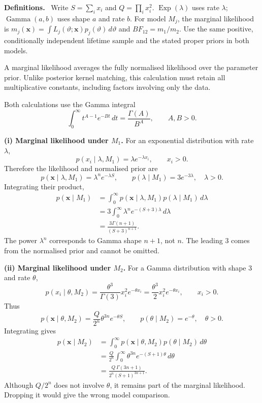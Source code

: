\documentclass[11pt,a4paper]{article}
\newcommand{\xvec}{\boldsymbol{x}}
\newcommand{\studyheading}[1]{%
  \par\medskip\noindent\textcolor{statblue}{\textbf{#1.}}\ }
\begin{document}
\studyheading{Definitions}
Write $S=\sum_i x_i$ and $Q=\prod_i x_i^2$.
$\operatorname{Exp}(\lambda)$ uses rate $\lambda$; $\operatorname{Gamma}(a,b)$ uses shape $a$ and rate $b$.
For model $M_j$, the marginal likelihood is
$m_j(\xvec)=\int L_j(\vartheta;\xvec)p_j(\vartheta)\,d\vartheta$ and $BF_{12}=m_1/m_2$.
Use the same positive, conditionally independent lifetime sample and the stated proper priors in both models.

A marginal likelihood averages the fully normalised likelihood over the
parameter prior. Unlike posterior kernel matching, this calculation must
retain all multiplicative constants, including factors involving only
the data.

Both calculations use the Gamma integral
\[
\int_0^\infty t^{A-1}e^{-Bt}\,dt
=\frac{\Gamma(A)}{B^A},\qquad A,B>0.
\]

\textbf{(i) Marginal likelihood under $M_1$.}
For an exponential distribution with rate $\lambda$,
\[
p(x_i\mid\lambda,M_1)=\lambda e^{-\lambda x_i},\qquad x_i>0.
\]
Therefore the likelihood and normalised prior are
\[
p(\xvec\mid\lambda,M_1)=\lambda^n e^{-\lambda S},
\qquad p(\lambda\mid M_1)=3e^{-3\lambda},\quad\lambda>0.
\]
Integrating their product,
\[
\begin{aligned}
p(\xvec\mid M_1)
&=\int_0^\infty p(\xvec\mid\lambda,M_1)
p(\lambda\mid M_1)\,d\lambda\\
&=3\int_0^\infty\lambda^n e^{-(S+3)\lambda}\,d\lambda\\
&=\boxed{\frac{3\Gamma(n+1)}{(S+3)^{n+1}}.}
\end{aligned}
\]
The power $\lambda^n$ corresponds to Gamma shape $n+1$, not $n$.
The leading $3$ comes from the normalised prior and cannot be omitted.

\textbf{(ii) Marginal likelihood under $M_2$.}
For a Gamma distribution with shape $3$ and rate $\theta$,
\[
p(x_i\mid\theta,M_2)
=\frac{\theta^3}{\Gamma(3)}x_i^2e^{-\theta x_i}
=\frac{\theta^3}{2}x_i^2e^{-\theta x_i},\qquad x_i>0.
\]
Thus
\[
p(\xvec\mid\theta,M_2)=\frac{Q}{2^n}\theta^{3n}e^{-\theta S},
\qquad p(\theta\mid M_2)=e^{-\theta},\quad\theta>0.
\]
Integrating gives
\[
\begin{aligned}
p(\xvec\mid M_2)
&=\int_0^\infty p(\xvec\mid\theta,M_2)
p(\theta\mid M_2)\,d\theta\\
&=\frac{Q}{2^n}\int_0^\infty\theta^{3n}e^{-(S+1)\theta}\,d\theta\\
&=\boxed{\frac{Q\,\Gamma(3n+1)}{2^n(S+1)^{3n+1}}.}
\end{aligned}
\]
Although $Q/2^n$ does not involve $\theta$, it remains part of the marginal
likelihood. Dropping it would give the wrong model comparison.
\end{document}
